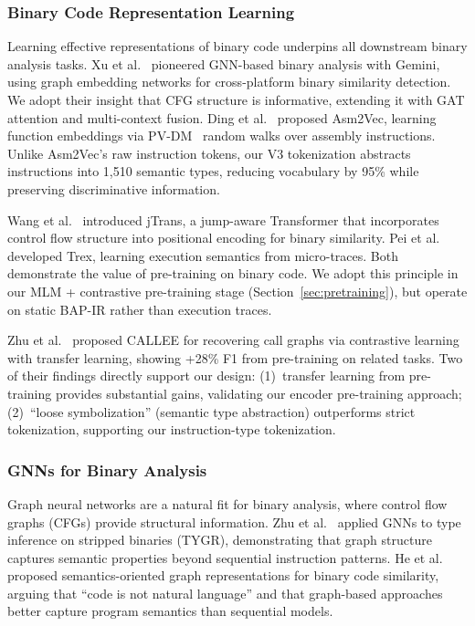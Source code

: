 \documentclass[sigconf,nonacm]{acmart}
\begin{document}
\subsubsection{Binary Code Representation Learning}

Learning effective representations of binary code underpins all downstream binary analysis tasks. Xu et al.~\cite{gemini} pioneered GNN-based binary analysis with Gemini, using graph embedding networks for cross-platform binary similarity detection. We adopt their insight that CFG structure is informative, extending it with GAT attention and multi-context fusion. Ding et al.~\cite{asm2vec} proposed Asm2Vec, learning function embeddings via PV-DM~\cite{word2vec} random walks over assembly instructions. Unlike Asm2Vec's raw instruction tokens, our V3 tokenization abstracts instructions into 1,510 semantic types, reducing vocabulary by 95\% while preserving discriminative information.

Wang et al.~\cite{jtrans} introduced jTrans, a jump-aware Transformer that incorporates control flow structure into positional encoding for binary similarity. Pei et al.~\cite{trex} developed Trex, learning execution semantics from micro-traces. Both demonstrate the value of pre-training on binary code. We adopt this principle in our MLM + contrastive pre-training stage (Section~\ref{sec:pretraining}), but operate on static BAP-IR rather than execution traces.

Zhu et al.~\cite{callee} proposed CALLEE for recovering call graphs via contrastive learning with transfer learning, showing +28\% F1 from pre-training on related tasks. Two of their findings directly support our design: (1)~transfer learning from pre-training provides substantial gains, validating our encoder pre-training approach; (2)~``loose symbolization'' (semantic type abstraction) outperforms strict tokenization, supporting our instruction-type tokenization.

\subsubsection{GNNs for Binary Analysis}

Graph neural networks are a natural fit for binary analysis, where control flow graphs (CFGs) provide structural information. Zhu et al.~\cite{tygr} applied GNNs to type inference on stripped binaries (TYGR), demonstrating that graph structure captures semantic properties beyond sequential instruction patterns. He et al.~\cite{codenl} proposed semantics-oriented graph representations for binary code similarity, arguing that ``code is not natural language'' and that graph-based approaches better capture program semantics than sequential models.
\end{document}
